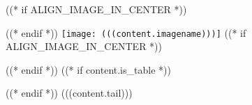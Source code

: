 ((* if ALIGN_IMAGE_IN_CENTER *))\begin{center}((* endif *))
\texttt{[image: (((content.imagename)))]}
((* if ALIGN_IMAGE_IN_CENTER *))\end{center}((* endif *))
((* if content.is_table *))\par\vspace{-5pt}((* endif *))
(((content.tail)))

